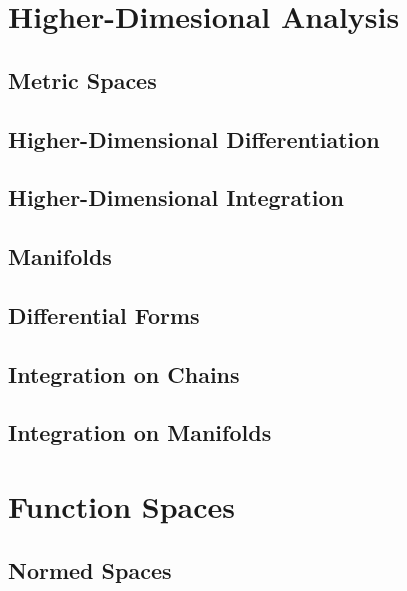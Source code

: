 \documentclass[12pt]{report}
\begin{document}
\part{Higher-Dimesional Analysis}


\chapter{Metric Spaces}

\chapter{Higher-Dimensional Differentiation}


\chapter{Higher-Dimensional Integration}



\chapter{Manifolds}



\chapter{Differential Forms}


\chapter{Integration on Chains}


\chapter{Integration on Manifolds}


\part{Function Spaces}


\chapter{Normed Spaces}
\end{document}
